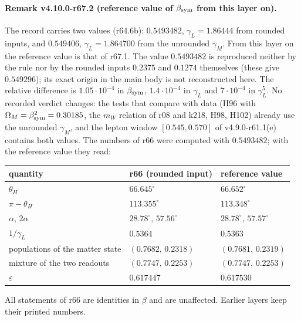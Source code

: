 \paragraph{Remark v4.10.0-r67.2 (reference value of \(\beta_{\rm sym}\) from this layer on).}
The record carries two values (r64.6b): \(0.5493482\), \(\gamma_L=1.86444\) from rounded inputs, and \(0.549406\), \(\gamma_L=1.864700\) from the
unrounded \(\gamma_M\).  From this layer on the reference value is that of r67.1.  The value \(0.5493482\) is reproduced neither by the rule nor by
the rounded inputs \(0.2375\) and \(0.1274\) themselves (these give \(0.549296\)); its exact origin in the main body is not reconstructed here.  The
relative difference is \(1.05\cdot10^{-4}\) in \(\beta_{\rm sym}\), \(1.4\cdot10^{-4}\) in \(\gamma_L\) and \(7\cdot10^{-4}\) in \(\gamma_L^5\).
No recorded verdict changes: the tests that compare with data (H96 with \(\Omega_M=\beta_{\rm sym}^2=0.30185\), the \(m_W\) relation of r08 and
k218, H98, H102) already use the unrounded \(\gamma_M\), and the lepton window \([0.545,0.570]\) of v4.9.0-r61.1(e) contains both values.
The numbers of r66 were computed with \(0.5493482\); with the reference value they read:
\begin{center}
\small
\begin{tabular}{@{}lll@{}}
\toprule
quantity & r66 (rounded input) & reference value\\
\midrule
\(\theta_H\) & \(66.645^\circ\) & \(66.652^\circ\)\\
\(\pi-\theta_H\) & \(113.355^\circ\) & \(113.348^\circ\)\\
\(\alpha\), \(2\alpha\) & \(28.78^\circ\), \(57.56^\circ\) & \(28.78^\circ\), \(57.57^\circ\)\\
\(1/\gamma_L\) & \(0.5364\) & \(0.5363\)\\
populations of the matter state & \((0.7682,\,0.2318)\) & \((0.7681,\,0.2319)\)\\
mixture of the two readouts & \((0.7747,\,0.2253)\) & \((0.7747,\,0.2253)\)\\
\(\varepsilon\) & \(0.617447\) & \(0.617530\)\\
\bottomrule
\end{tabular}
\end{center}
All statements of r66 are identities in \(\beta\) and are unaffected.  Earlier layers keep their printed numbers.

